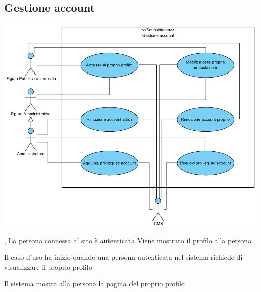\subsection{Gestione account}
\begin{center}
   \includegraphics[width=\textwidth]{assets/visualParadigm/GestioneAccount}
\end{center}
{, }
{La persona connessa al sito è autenticata}
{Viene mostrato il profilo alla persona}
{\begin{enumCU}
	\item Il caso d'uso ha inizio quando una persona autenticata nel sistema richiede di visualizzare il proprio profilo
	\item Il sistema mostra alla persona la pagina del proprio profilo
\end{enumCU}}

\tabcuvspace

